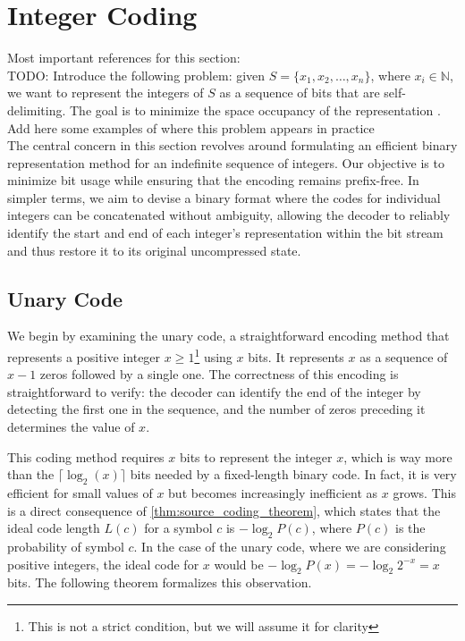 \clearpage
\section{Integer Coding}

Most important references for this section: \cite{ferragina2023pearls,sayood2002lossless,navarro2016compact} \\

\noindent TODO: Introduce the following problem: given $S=\{x_1,x_2,\ldots,x_n\}$, where $x_i\in\mathbb{N}$, we want to represent the integers of $S$ as a sequence of bits that are self-delimiting. The goal is to minimize the space occupancy of the representation \cite{ferragina2023pearls}. Add here some examples of where this problem appears in practice \cite{witten1999managing} \\

\noindent The central concern in this section revolves around formulating an efficient binary representation method for an indefinite sequence of integers. Our objective is to minimize bit usage while ensuring that the encoding remains prefix-free. In simpler terms, we aim to devise a binary format where the codes for individual integers can be concatenated without ambiguity, allowing the decoder to reliably identify the start and end of each integer's representation within the bit stream and thus restore it to its original uncompressed state.

\subsection{Unary Code}
We begin by examining the unary code, a straightforward encoding method that represents a positive integer $x \geq 1$\footnote{This is not a strict condition, but we will assume it for clarity} using $x$ bits. It represents $x$ as a sequence of $x-1$ zeros followed by a single one. The correctness of this encoding is straightforward to verify: the decoder can identify the end of the integer by detecting the first one in the sequence, and the number of zeros preceding it determines the value of $x$. \vspace{0.4cm}

\noindent This coding method requires $x$ bits to represent the integer $x$, which is way more than the $\lceil\log_2(x)\rceil$ bits needed by a fixed-length binary code. In fact, it is very efficient for small values of $x$ but becomes increasingly inefficient as $x$ grows. This is a direct consequence of \autoref{thm:source_coding_theorem}, which states that the ideal code length $L(c)$ for a symbol $c$ is $-\log_2 P(c)$, where $P(c)$ is the probability of symbol $c$. In the case of the unary code, where we are considering positive integers, the ideal code for $x$ would be $-\log_2 P(x) = -\log_2 2^{-x} = x$ bits. The following theorem formalizes this observation. \cite{ferragina2023pearls}


